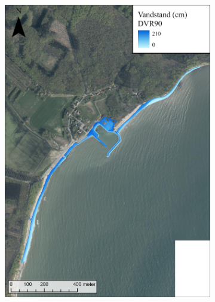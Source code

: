 \begin{figure}[H]
    \begin{subfigure}[t]{0.5\textwidth}
        \centering
        \includegraphics[width=0.95\linewidth]{images/Resultater/2023Malt/2023 resultat_hesnaes.jpg}
        \caption{}
        \label{Subfig: Målt Hesnæs}
    \end{subfigure}
    \begin{subfigure}[t]{0.5\textwidth}
        \centering

\end{subfigure}
\end{figure}
